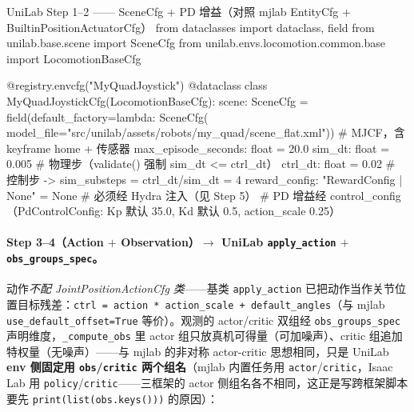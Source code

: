 \begin{codebox}[Python]{UniLab Step 1--2 —— SceneCfg $+$ PD 增益（对照 mjlab EntityCfg $+$ BuiltinPositionActuatorCfg）}
from dataclasses import dataclass, field
from unilab.base.scene import SceneCfg
from unilab.envs.locomotion.common.base import LocomotionBaseCfg

@registry.envcfg("MyQuadJoystick")
@dataclass
class MyQuadJoystickCfg(LocomotionBaseCfg):
    scene: SceneCfg = field(default_factory=lambda: SceneCfg(
        model_file="src/unilab/assets/robots/my_quad/scene_flat.xml"))  # MJCF，含 keyframe home + 传感器
    max_episode_seconds: float = 20.0
    sim_dt: float = 0.005          # 物理步（validate() 强制 sim_dt <= ctrl_dt）
    ctrl_dt: float = 0.02          # 控制步 -> sim_substeps = ctrl_dt/sim_dt = 4
    reward_config: "RewardConfig | None" = None   # 必须经 Hydra 注入（见 Step 5）
    # PD 增益经 control_config（PdControlConfig: Kp 默认 35.0, Kd 默认 0.5, action_scale 0.25）
\end{codebox}

\paragraph{Step 3--4（Action $+$ Observation）$\to$ UniLab \texttt{apply\_action} $+$ \texttt{obs\_groups\_spec}。}动作\emph{不配 JointPositionActionCfg 类}——基类 \verb|apply_action| 已把动作当作关节位置目标残差：\verb|ctrl = action * action_scale + default_angles|（与 mjlab \verb|use_default_offset=True| 等价）。观测的 actor/critic 双组经 \verb|obs_groups_spec| 声明维度，\verb|_compute_obs| 里 actor 组只放真机可得量（可加噪声）、critic 组追加特权量（无噪声）——与 mjlab 的非对称 actor-critic 思想相同，只是 UniLab \textbf{env 侧固定用 \texttt{obs}/\texttt{critic} 两个组名}（mjlab 内置任务用 \verb|actor|/\verb|critic|，Isaac Lab 用 \verb|policy|/\verb|critic|——三框架的 actor 侧组名各不相同，这正是写跨框架脚本要先 \verb|print(list(obs.keys()))| 的原因）：

